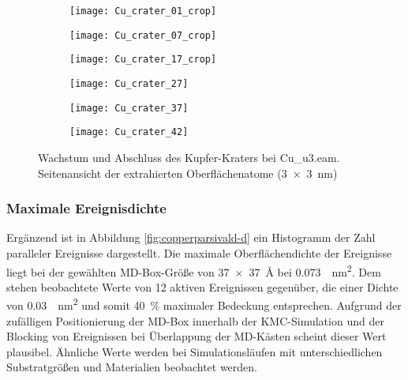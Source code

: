 \begin{figure}

  \captionsetup[subfigure]{justification=centering,singlelinecheck=false}
  \def\subfigwidth{0.32\textwidth}

  \begin{subfigure}[t]{\subfigwidth}
    \texttt{[image: Cu\_crater\_01\_crop]}
  \end{subfigure}
  \hfill
  \begin{subfigure}[t]{\subfigwidth}
    \texttt{[image: Cu\_crater\_07\_crop]}
  \end{subfigure}
  \hfill
  \begin{subfigure}[t]{\subfigwidth}
    \texttt{[image: Cu\_crater\_17\_crop]}
  \end{subfigure}

  \begin{subfigure}[t]{\subfigwidth}
    \texttt{[image: Cu\_crater\_27]}
  \end{subfigure}
  \hfill
  \begin{subfigure}[t]{\subfigwidth}
    \texttt{[image: Cu\_crater\_37]}
  \end{subfigure}
  \hfill
  \begin{subfigure}[t]{\subfigwidth}
    \texttt{[image: Cu\_crater\_42]}
  \end{subfigure}

  \caption{Wachstum und Abschluss des Kupfer-Kraters bei Cu\_u3.eam.\\
    Seitenansicht der extrahierten Oberflächenatome (\SI{3x3}{\nano\meter})
  }
  \label{fig:coppercrater}
\end{figure}

\subsubsection{Maximale Ereignisdichte}
Ergänzend ist in Abbildung \ref{fig:copperparsivald-d} ein Histogramm der Zahl paralleler Ereignisse dargestellt.
Die maximale Oberflächendichte der Ereignisse liegt bei der gewählten MD-Box-Größe von \SI{37x37}{\angstrom} bei \SI{0.073}{\per\nano\meter\squared}.
Dem stehen beobachtete Werte von 12 aktiven Ereignissen gegenüber, die einer Dichte von \SI{0.03}{\per\nano\meter\squared} und somit \SI{40}{\percent} maximaler Bedeckung entsprechen.
Aufgrund der zufälligen Positionierung der MD-Box innerhalb der KMC-Simulation und der Blocking von Ereignissen bei Überlappung der MD-Kästen scheint dieser Wert plausibel.
Ähnliche Werte werden bei Simulationsläufen mit unterschiedlichen Substratgrößen und Materialien beobachtet werden.
